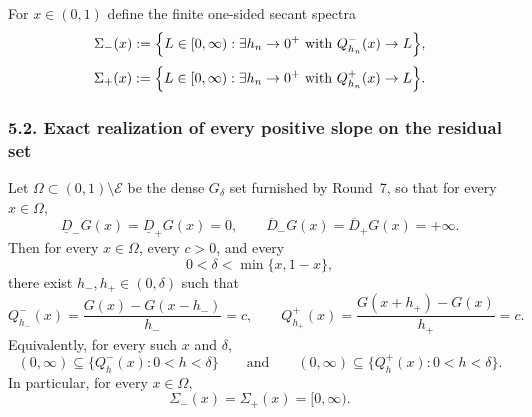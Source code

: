 For $x\in(0,1)$ define the finite one-sided secant spectra
\[
\Sigma_-(x):=\Bigl\{L\in[0,\infty):\exists h_n\to0^+\text{ with }Q_{h_n}^-(x)\to L\Bigr\},
\]
\[
\Sigma_+(x):=\Bigl\{L\in[0,\infty):\exists h_n\to0^+\text{ with }Q_{h_n}^+(x)\to L\Bigr\}.
\]

\subsubsection*{5.2. Exact realization of every positive slope on the residual set}

\begin{theorem}\label{thm:round8-main}
Let $\Omega\subset(0,1)\setminus\mathcal E$ be the dense $G_\delta$ set furnished by Round~7, so that for every $x\in\Omega$,
\[
\underline D_-G(x)=\underline D_+G(x)=0,
\qquad
\overline D_-G(x)=\overline D_+G(x)=+\infty.
\]
Then for every $x\in\Omega$, every $c>0$, and every
\[
0<\delta<\min\{x,1-x\},
\]
there exist $h_-,h_+\in(0,\delta)$ such that
\[
Q_{h_-}^-(x)=\frac{G(x)-G(x-h_-)}{h_-}=c,
\qquad
Q_{h_+}^+(x)=\frac{G(x+h_+)-G(x)}{h_+}=c.
\]
Equivalently, for every such $x$ and $\delta$,
\[
(0,\infty)\subseteq\{Q_h^-(x):0<h<\delta\}
\qquad\text{and}\qquad
(0,\infty)\subseteq\{Q_h^+(x):0<h<\delta\}.
\]
In particular, for every $x\in\Omega$,
\[
\Sigma_-(x)=\Sigma_+(x)=[0,\infty).
\]
\end{theorem}

